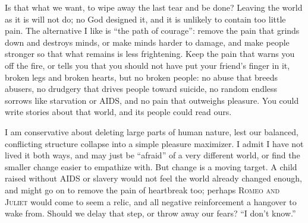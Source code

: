 Is that what we want, to wipe away the last tear and be done? Leaving the world as it is will not do; no God designed it, and it is unlikely to contain too little pain. The alternative I like is ``the path of courage'': remove the pain that grinds down and destroys minds, or make minds harder to damage, and make people stronger so that what remains is less frightening. Keep the pain that warns you off the fire, or tells you that you should not have put your friend's finger in it, broken legs and broken hearts, but no broken people: no abuse that breeds abusers, no drudgery that drives people toward suicide, no random endless sorrows like starvation or AIDS, and no pain that outweighs pleasure. You could write stories about that world, and its people could read ours.

I am conservative about deleting large parts of human nature, lest our balanced, conflicting structure collapse into a simple pleasure maximizer. I admit I have not lived it both ways, and may just be ``afraid'' of a very different world, or find the smaller change easier to empathize with. But change is a moving target. A child raised without AIDS or slavery would not feel the world already changed enough, and might go on to remove the pain of heartbreak too; perhaps \textsc{Romeo and Juliet} would come to seem a relic, and all negative reinforcement a hangover to wake from. Should we delay that step, or throw away our fears? ``I don't know.''
